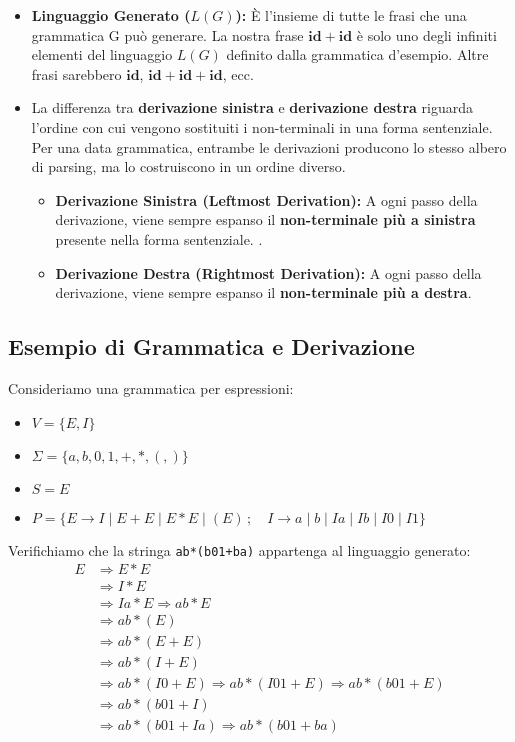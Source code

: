 \begin{itemize}
    \item \textbf{Linguaggio Generato ($L(G)$):} 
    È l'insieme di tutte le frasi che una grammatica G può generare. La nostra frase $\mathbf{id} + \mathbf{id}$ è solo uno degli infiniti elementi del linguaggio $L(G)$ definito dalla grammatica d'esempio. Altre frasi sarebbero $\mathbf{id}$, $\mathbf{id} + \mathbf{id} + \mathbf{id}$, ecc.
    
    \item La differenza tra \textbf{derivazione sinistra} e \textbf{derivazione destra} riguarda l'ordine con cui vengono sostituiti i non-terminali in una forma sentenziale. Per una data grammatica, entrambe le derivazioni producono lo stesso albero di parsing, ma lo costruiscono in un ordine diverso.
    \begin{itemize}
        \item \textbf{Derivazione Sinistra (Leftmost Derivation):} A ogni passo della derivazione, viene sempre espanso il \textbf{non-terminale più a sinistra} presente nella forma sentenziale. .
        
        \item \textbf{Derivazione Destra (Rightmost Derivation):} A ogni passo della derivazione, viene sempre espanso il \textbf{non-terminale più a destra}.
    \end{itemize}
\end{itemize}
\subsection{Esempio di Grammatica e Derivazione}
Consideriamo una grammatica per espressioni:
\begin{itemize}
    \item $V = \{E, I\}$
    \item $\Sigma = \{a, b, 0, 1, +, *, (, )\}$
    \item $S = E$
    \item $P = \{ E \rightarrow I \mid E+E \mid E*E \mid (E) \, ; \quad I \rightarrow a \mid b \mid Ia \mid Ib \mid I0 \mid I1 \}$
\end{itemize}

Verifichiamo che la stringa \texttt{ab*(b01+ba)} appartenga al linguaggio generato:
\begin{align*}
E & \Rightarrow E * E \\
  & \Rightarrow I * E \\
  & \Rightarrow Ia * E \Rightarrow ab * E \\
  & \Rightarrow ab * (E) \\
  & \Rightarrow ab * (E + E) \\
  & \Rightarrow ab * (I + E) \\
  & \Rightarrow ab * (I0 + E) \Rightarrow ab * (I01 + E) \Rightarrow ab * (b01 + E) \\
  & \Rightarrow ab * (b01 + I) \\
  & \Rightarrow ab * (b01 + Ia) \Rightarrow ab * (b01 + ba)
\end{align*}

